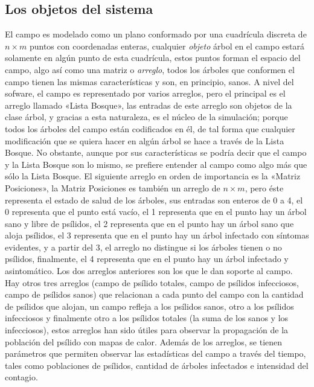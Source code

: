 \subsection{Los objetos del sistema}
El campo es modelado como un plano conformado por una cuadrícula discreta de $n \times m$ puntos con coordenadas enteras, cualquier \textit{objeto} árbol en el campo estará solamente en algún punto de esta cuadrícula, estos puntos forman el espacio del campo, algo así como una matriz o \textit{arreglo}, todos los árboles que conformen el campo tienen las mismas características y son, en principio, sanos. A nivel del sofware, el campo es representado por varios arreglos, pero el principal es el arreglo llamado «Lista Bosque», las entradas de este arreglo son objetos de la clase árbol, y gracias a esta naturaleza, es el núcleo de la simulación; porque todos los árboles del campo están codificados en él, de tal forma que cualquier modificación que se quiera hacer en algún árbol se hace a través de la Lista Bosque. No obstante, aunque por sus características se podría decir que el campo y la Lista Bosque son lo mismo, se prefiere entender al campo como algo más que sólo la Lista Bosque. El siguiente arreglo en orden de importancia es la «Matriz Posiciones», la Matriz Posiciones es también un arreglo de $n \times m$, pero éste representa el estado de salud de los árboles, sus entradas son enteros de 0 a 4, el 0 representa que el punto está vacío, el 1 representa que en el punto hay un árbol sano y libre de psílidos, el 2 representa que en el punto hay un árbol sano que aloja psílidos, el 3 representa que en el punto hay un árbol infectado con síntomas evidentes, y a partir del 3, el arreglo no distingue si los árboles tienen o no psílidos, finalmente, el 4 representa que en el punto hay un árbol infectado y asintomático. Los dos arreglos anteriores son los que le dan soporte al campo. Hay otros tres arreglos (campo de psílido totales, campo de psílidos infecciosos, campo de psílidos sanos) que relacionan a cada punto del campo con la cantidad de psílidos que alojan, un campo refleja a los psílidos sanos, otro a los psílidos infecciosos y finalmente otro a los psílidos totales (la suma de los sanos y los infecciosos), estos arreglos han sido útiles para observar la propagación de la población del psílido con mapas de calor. Además de los arreglos, se tienen parámetros que permiten observar las estadísticas del campo a través del tiempo, tales como poblaciones de psílidos, cantidad de árboles infectados e intensidad del contagio.

